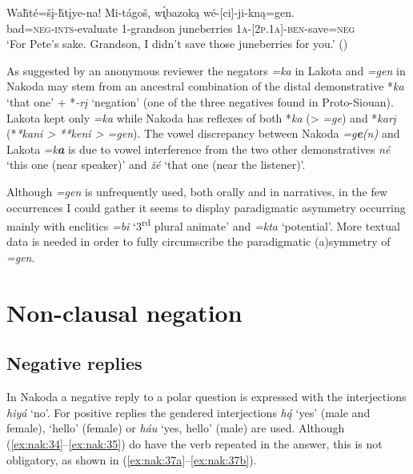 \documentclass[output=paper,colorlinks,citecolor=brown]{langscibook}
\begin{document}
\ea\label{ex:nak:17}
    \gll Waȟté=šį-ȟtįye-na! Mi-tágoš, w\'{\k{ı}}bazoką wé-[ci]-ji-kną=gen.\\
         bad=\textsc{neg-ints}-evaluate \textsc{1}-grandson juneberries \textsc{1a-[2p.1a]-ben}-save=\textsc{neg}\\
    \glt ‘For Pete’s sake. Grandson, I didn’t save those juneberries for you.’ (\citealt[127]{ParksDeMallie2012b})
\z

As suggested by an anonymous reviewer the negators \textit{=ka} in Lakota and \textit{=gen} in Nakoda may stem from an ancestral combination of the distal demonstrative *\textit{ka} ‘that one’ + *\textit{-rį} ‘negation’ (one of the three negatives found in Proto-Siouan). Lakota kept only \textit{=ka} while Nakoda has reflexes of both *\textit{ka} (> \textit{=ge}) and *\textit{karį} (*\textit{*kani > **keni > =gen}). The vowel discrepancy between Nakoda \textit{=g\textbf{e}(n)} and Lakota \textit{=k\textbf{a}} is due to vowel interference from the two other demonstratives \textit{né} ‘this one (near speaker)’ and \textit{žé} ‘that one (near the listener)’.

Although \textit{=gen} is unfrequently used, both orally and in narratives, in the few occurrences I could gather it seems to display paradigmatic asymmetry occurring mainly with enclitics \textit{=bi} ‘3\textsuperscript{rd} plural animate’ and \textit{=kta} ‘potential’. More textual data is needed in order to fully circumscribe the paradigmatic (a)symmetry of \textit{=gen}. 


\section{Non-clausal negation}\label{sec:nak:3}
\subsection{Negative replies}\label{sec:nak:3.1}

In Nakoda a negative reply to a polar question is expressed with the interjections \textit{hiyá} ‘no’. For positive replies the gendered interjections \textit{h\'{ą}} ‘yes’ (male and female), ‘hello’ (female) or \textit{háu} ‘yes, hello’ (male) are used. Although (\ref{ex:nak:34}--\ref{ex:nak:35}) do have the verb repeated in the answer, this is not obligatory, as shown in (\ref{ex:nak:37a}--\ref{ex:nak:37b}).
\end{document}
